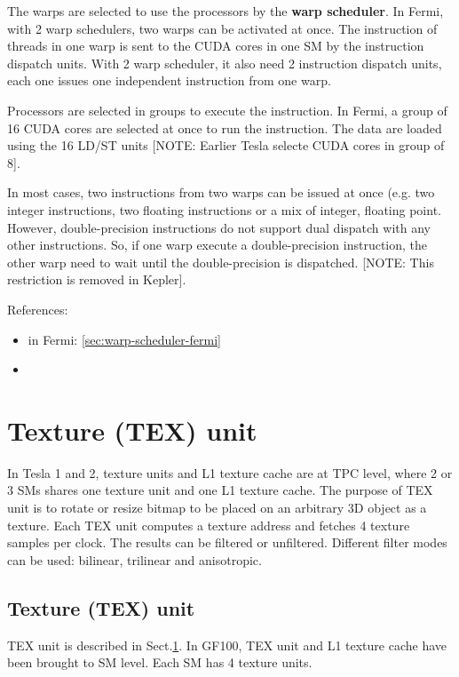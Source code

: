 The warps are selected to use the processors by the {\bf warp scheduler}. In
Fermi, with 2 warp schedulers, two warps can be activated at once. The
instruction of threads in one warp is sent to the CUDA cores in one SM by the
instruction dispatch units. With 2 warp scheduler, it also need 2 instruction
dispatch units, each one issues one independent instruction from one warp.

Processors are selected in groups to execute the instruction. In Fermi, a group
of 16 CUDA cores are selected at once to run the instruction. The data are
loaded using the 16 LD/ST units [NOTE: Earlier Tesla selecte CUDA cores in
group of 8]. 

In most cases, two instructions from two warps can be issued at once (e.g. two
integer instructions, two floating instructions or a mix of integer, floating
point. However, double-precision instructions do not support dual dispatch with
any other instructions. So, if one warp execute a double-precision instruction,
the other warp need to wait until the double-precision is dispatched. [NOTE:
This restriction is removed in Kepler].

References:
\begin{itemize} 
  \item in Fermi: \ref{sec:warp-scheduler-fermi}
  \item 
\end{itemize}

\section{Texture (TEX) unit}
\label{sec:texture-unit}

In Tesla 1 and 2, texture units and L1 texture cache are at TPC level,
where 2 or 3 SMs shares one texture unit and one L1 texture cache. The
purpose of TEX unit is to rotate or resize bitmap to be placed on an
arbitrary 3D object as a texture. Each TEX unit computes a texture address and
fetches 4 texture samples per clock. The results can be filtered or
unfiltered. Different filter modes can be used: bilinear, trilinear and
anisotropic.



\subsection{Texture (TEX) unit}
\label{sec:texture-unit-Fermi}

TEX unit is described in Sect.\ref{sec:texture-unit}. In GF100, TEX unit and L1
texture cache have been brought to SM level. Each SM has 4 texture units.

